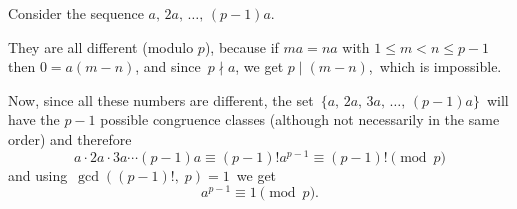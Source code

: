 \documentclass[12pt]{article}
\begin{document}
Consider the sequence $a,\,2a,\,\ldots,\,(p-1)a$.

They are all different (modulo $p$), because if $ma=na$ with $1\le m<n\le p-1$ then
$0=a(m-n)$, and since\, $p\nmid a$, we get $p\mid(m-n)$,\, which is impossible.

Now, since all these numbers are different, the set \,$\{a,\,2a,\,3a,\,\ldots,\,(p-1)a\}$\, will have the $p-1$ possible congruence classes (although not necessarily in the same order) and therefore 
$$a\cdot2a\cdot3a\cdots (p-1)a\equiv (p-1)!a^{p-1}\equiv (p-1)!\pmod{p}$$
and using\, $\gcd((p-1)!,\;p)=1$\, we get
$$a^{p-1}\equiv 1\pmod{p}.$$
\end{document}

